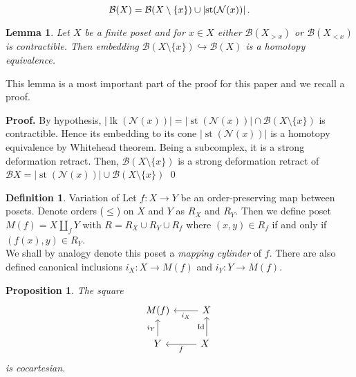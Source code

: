 \documentclass[english,12pt]{article}
\newcounter{stmcounter}[section]
\numberwithin{equation}{section}
\newtheorem{proposition}[stmcounter]{Proposition}
\newtheorem{lemma}[stmcounter]{Lemma}
\theoremstyle{definition}
\newtheorem{definition}[stmcounter]{Definition}
\theoremstyle{remark}
\newenvironment{pf}{\noindent\textbf{Proof.}}{\qed}
\newcommand{\define}[1]{{\textit{#1}}}
\renewcommand{\leq}{\leqslant}
\begin{document}
\begin{equation}\label{covering}
  \mathcal{B}(X) = \mathcal{B}(X \setminus \{x\}) \cup \left|\operatorname{st}(\mathcal{N}(x))\right|.\\
\end{equation}

\begin{lemma}
  \label{lem:homotopy}
  Let $X$ be a finite poset and for $x \in X$ either $\mathcal{B}(X_{>x})$ or $\mathcal{B}(X_{<x})$ is contractible. Then embedding $\mathcal{B}(X \setminus \{x\}) \hookrightarrow \mathcal{B}(X)$ is a homotopy equivalence.
\end{lemma}

This lemma is a most important part of the proof for this paper and we recall a proof.

\begin{pf}
  By hypothesis, $\left|\operatorname{lk}(\mathcal{N}(x))\right| = \left|\operatorname{st}(\mathcal{N}(x))\right| \cap \mathcal{B}(X \setminus \{x\})$ is contractible. Hence its embedding to its cone $\left|\operatorname{st}(\mathcal{N}(x))\right|$ is a homotopy equivalence by Whitehead theorem. Being a subcomplex, it is a strong deformation retract. Then, $\mathcal{B}(X \setminus \{x\})$ is a strong deformation retract of $\mathcal{B}X = \left|\operatorname{st}(\mathcal{N}(x))\right| \cup \mathcal{B}(X \setminus \{x\})$
\end{pf}

\begin{definition} {Variation of \cite[Proposition 2.1]{Bar11}}
  Let $f : X \to Y$ be an order-preserving map between posets. Denote orders ($\leq$) on $X$ and $Y$ as $R_X$ and $R_Y$. Then we define poset $M(f) = X \coprod_f Y$ with $R = R_X \cup R_Y \cup R_{f}$ where $(x,y) \in R_f$ if and only if $(f(x),y) \in R_Y$.\\

  We shall by analogy denote this poset a \define{mapping cylinder} of $f$. There are also defined canonical inсlusions $i_X : X \to M(f)$ and $i_Y : Y \to M(f)$.
\end{definition}

\begin{proposition}
  The square
  \begin{equation}
  \begin{tikzcd}
  M(f) & X\arrow{l}{i_X} \\
  Y\arrow{u}{i_Y} & X\arrow{l}{f}\arrow{u}{\operatorname{Id}}\
  \end{tikzcd}
  \end{equation}
  is cocartesian.
\end{proposition}
\end{document}
